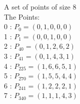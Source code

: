 A set of points of size 8\\
The Points:\\
0 : $P_{0} = ( 0, 1, 0, 0, 0 )$\\
1 : $P_{1} = ( 0, 0, 1, 0, 0 )$\\
2 : $P_{40} = ( 0, 1, 2, 6, 2 )$\\
3 : $P_{41} = ( 0, 1, 4, 3, 1 )$\\
4 : $P_{225} = ( 1, 6, 6, 5, 1 )$\\
5 : $P_{270} = ( 1, 5, 5, 4, 4 )$\\
6 : $P_{241} = ( 1, 2, 2, 2, 1 )$\\
7 : $P_{340} = ( 1, 1, 1, 4, 3 )$\\
